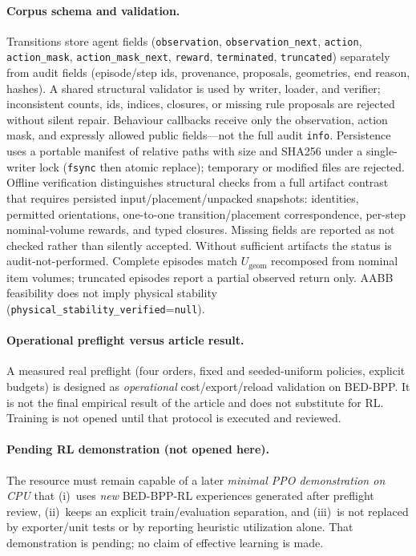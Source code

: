 \paragraph{Corpus schema and validation.}
Transitions store agent fields
(\texttt{observation}, \texttt{observation\_next}, \texttt{action},
\texttt{action\_mask}, \texttt{action\_mask\_next}, \texttt{reward},
\texttt{terminated}, \texttt{truncated})
separately from audit fields
(episode/step ids, provenance, proposals, geometries, end reason, hashes).
A shared structural validator is used by writer, loader, and verifier; inconsistent
counts, ids, indices, closures, or missing rule proposals are rejected without
silent repair. Behaviour callbacks receive only the observation, action mask, and
expressly allowed public fields---not the full audit \texttt{info}. Persistence
uses a portable manifest of relative paths with size and SHA256 under a
single-writer lock (\texttt{fsync} then atomic replace); temporary or modified
files are rejected. Offline verification distinguishes structural checks from a full artifact
contrast that requires persisted input/placement/unpacked snapshots: identities,
permitted orientations, one-to-one transition/placement correspondence,
per-step nominal-volume rewards, and typed closures. Missing fields are reported
as not checked rather than silently accepted. Without sufficient artifacts the
status is audit-not-performed. Complete episodes match \(U_{\mathrm{geom}}\)
recomposed from nominal item volumes; truncated episodes report a partial
observed return only. AABB feasibility does not imply physical stability
(\texttt{physical\_stability\_verified}=\texttt{null}).

\paragraph{Operational preflight versus article result.}
A measured real preflight (four orders, fixed and seeded-uniform policies,
explicit budgets) is designed as \emph{operational} cost/export/reload
validation on BED-BPP. It is not the final empirical result of the article and
does not substitute for RL. Training is not opened until that protocol is
executed and reviewed.

\paragraph{Pending RL demonstration (not opened here).}
The resource must remain capable of a later \emph{minimal PPO demonstration on
CPU} that (i)~uses \emph{new} BED-BPP-RL experiences generated after preflight
review, (ii)~keeps an explicit train/evaluation separation, and (iii)~is not
replaced by exporter/unit tests or by reporting heuristic utilization alone.
That demonstration is pending; no claim of effective learning is made.
